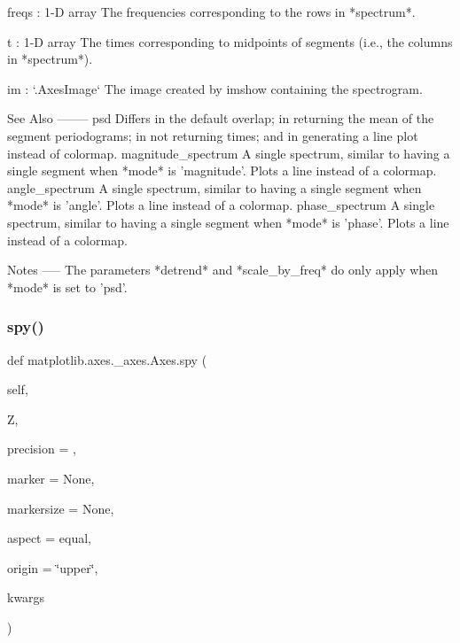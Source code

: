 \begin{DoxyVerb}
\begin{DoxyVerb}
freqs : 1-D array
    The frequencies corresponding to the rows in *spectrum*.

t : 1-D array
    The times corresponding to midpoints of segments (i.e., the columns
    in *spectrum*).

im : `.AxesImage`
    The image created by imshow containing the spectrogram.

See Also
--------
psd
    Differs in the default overlap; in returning the mean of the
    segment periodograms; in not returning times; and in generating a
    line plot instead of colormap.
magnitude_spectrum
    A single spectrum, similar to having a single segment when *mode*
    is 'magnitude'. Plots a line instead of a colormap.
angle_spectrum
    A single spectrum, similar to having a single segment when *mode*
    is 'angle'. Plots a line instead of a colormap.
phase_spectrum
    A single spectrum, similar to having a single segment when *mode*
    is 'phase'. Plots a line instead of a colormap.

Notes
-----
The parameters *detrend* and *scale_by_freq* do only apply when *mode*
is set to 'psd'.
\end{DoxyVerb}
 \mbox{\label{classmatplotlib_1_1axes_1_1__axes_1_1Axes_a4e0fc4cdef20c3722fbc734f7ecd8cbf}} 
\subsubsection{\texorpdfstring{spy()}{spy()}}
{\footnotesize\ttfamily def matplotlib.\+axes.\+\_\+axes.\+Axes.\+spy (\begin{DoxyParamCaption}\item[{}]{self,  }\item[{}]{Z,  }\item[{}]{precision = {},  }\item[{}]{marker = {\ttfamily None},  }\item[{}]{markersize = {\ttfamily None},  }\item[{}]{aspect = {\ttfamily \textquotesingle{}equal\textquotesingle{}},  }\item[{}]{origin = {\ttfamily \char`\"{}upper\char`\"{}},  }\item[{}]{kwargs }\end{DoxyParamCaption})}


\end{DoxyVerb}
